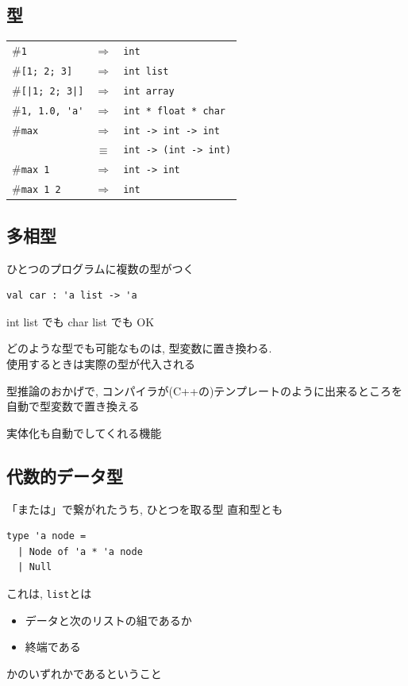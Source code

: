 \documentclass[papersize,30pt,slide]{jsarticle}
\begin{document}
\newpage
\subsection{型}
\begin{tabular}{lcl}
\#\lstinline|1| &$\Longrightarrow$& \lstinline|int|\\
\#\lstinline|[1; 2; 3]| &$\Longrightarrow$& \lstinline|int list|\\
\#\lstinline![|1; 2; 3|]! &$\Longrightarrow$& \lstinline|int array|\\
\#\lstinline|1, 1.0, 'a'| &$\Longrightarrow$& \lstinline|int * float * char| \\
\#\lstinline|max| &$\Longrightarrow$& \lstinline|int -> int -> int|\\
                &$\equiv$& \lstinline|int -> (int -> int)| \\
\#\lstinline|max 1| &$\Longrightarrow$& \lstinline|int -> int|\\
\#\lstinline|max 1 2| &$\Longrightarrow$& \lstinline|int|\\
\end{tabular}

\newpage
\subsection{多相型}
ひとつのプログラムに複数の型がつく

\begin{lstlisting}
val car : 'a list -> 'a
\end{lstlisting}
int list でも char list でも OK

どのような型でも可能なものは, 型変数に置き換わる.\\
使用するときは実際の型が代入される

\vspace{1em}

型推論のおかげで, コンパイラが(C++の)テンプレートのように出来るところを自動で型変数で置き換える

実体化も自動でしてくれる機能

\newpage

\subsection{代数的データ型}
「または」で繋がれたうち, ひとつを取る型 直和型とも

\begin{lstlisting}
type 'a node =
  | Node of 'a * 'a node
  | Null
\end{lstlisting}
これは, \lstinline|list|とは
\begin{itemize}
\item データと次のリストの組であるか
\item 終端である
\end{itemize}
かのいずれかであるということ
\end{document}

